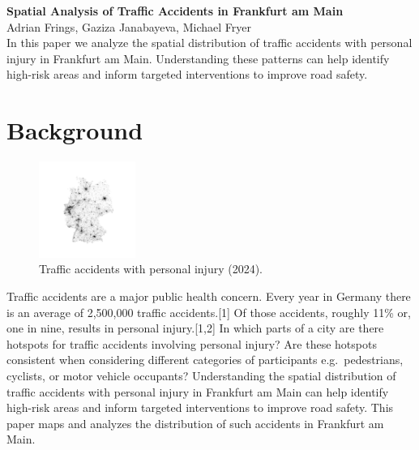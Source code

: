 \documentclass[10pt,a4paper]{article} %
\begin{document}
\begin{center}
    {\large\bfseries Spatial Analysis of Traffic Accidents in Frankfurt am Main}\\[0.5em]
    {\small Adrian Frings, Gaziza Janabayeva, Michael Fryer}\\[1em]
    {\small In this paper we analyze the spatial distribution of traffic accidents with personal injury in Frankfurt am Main. Understanding these patterns can help identify high-risk areas and inform targeted interventions to improve road safety.}
\end{center}


\section*{Background}
\begin{figure}
    \centering
    \vspace{0pt}
    \includegraphics[width=0.28\textwidth]{../src/img/de-2024-bw.png}
    \caption{Traffic accidents with personal injury (2024).}
    \vspace{-30pt}
\end{figure}

Traffic accidents are a major public health concern. Every year in Germany there is an average of 2,500,000 traffic accidents.[1] Of those accidents, roughly 11\% or, one in nine, results in personal injury.[1,2] In which parts of a city are there hotspots for traffic accidents involving personal injury? Are these hotspots consistent when considering different categories of participants e.g.\ pedestrians, cyclists, or motor vehicle occupants? Understanding the spatial distribution of traffic accidents with personal injury in Frankfurt am Main can help identify high-risk areas and inform targeted interventions to improve road safety. This paper maps and analyzes the distribution of such accidents in Frankfurt am Main.
\end{document}
